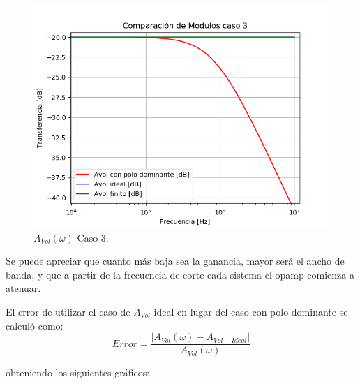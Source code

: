 \begin{figure}[H]	
	\centering
	\includegraphics[width=\textwidth]{Ejercicio1/Imagenes/HCompC3.png}
	\caption{$A_{Vol}(\omega)$ Caso 3.}
	\label{fig:AvolC3}
\end{figure}

Se puede apreciar que cuanto más baja sea la ganancia, mayor será el ancho de banda, y que a partir de la frecuencia de corte cada sistema el opamp comienza a atenuar.

El error de utilizar el caso de $A_{Vol}$ ideal en lugar del caso con polo dominante se calculó como:
\begin{equation}
	Error = \frac{|A_{Vol}(\omega)-A_{Vol-Ideal}|}{A_{Vol}(\omega)}
	\label{equ:error}
\end{equation}

obteniendo los siguientes gráficos:

